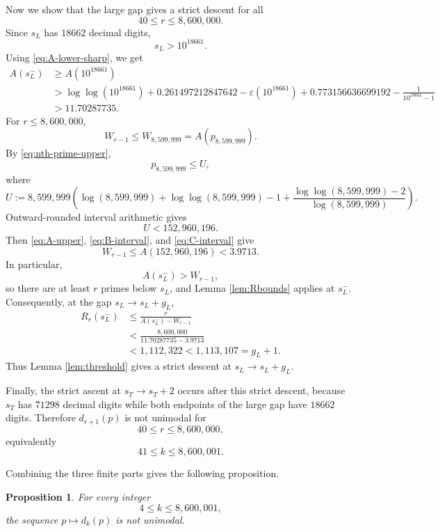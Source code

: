 \documentclass[11pt]{article}
\numberwithin{equation}{section}
\theoremstyle{plain}
\newtheorem{proposition}[theorem]{Proposition}
\theoremstyle{definition}
\theoremstyle{remark}
\newcommand{\eps}{\varepsilon}
\begin{document}
Now we show that the large gap gives a strict descent for all
\[
        40\le r\le8{,}600{,}000.
\]
Since \(s_L\) has \(18662\) decimal digits,
\[
        s_L>10^{18661}.
\]
Using \eqref{eq:A-lower-sharp}, we get
\[
\begin{aligned}
        A(s_L^-)
        &\ge
        A(10^{18661}) \\
        &>
        \log\log(10^{18661})
        +0.261497212847642
        -\eps(10^{18661})
        +0.773156636699192
        -\frac1{10^{18661}-1}\\
        &>11.70287735.
\end{aligned}
\]
For \(r\le8{,}600{,}000\),
\[
        W_{r-1}\le W_{8{,}599{,}999}=A(p_{8{,}599{,}999}).
\]
By \eqref{eq:nth-prime-upper},
\[
        p_{8{,}599{,}999}\le U,
\]
where
\[
        U:=8{,}599{,}999\left(
        \log(8{,}599{,}999)+\log\log(8{,}599{,}999)-1+
        \frac{\log\log(8{,}599{,}999)-2}{\log(8{,}599{,}999)}
        \right).
\]
Outward-rounded interval arithmetic gives
\[
        U<152{,}960{,}196.
\]
Then \eqref{eq:A-upper}, \eqref{eq:B-interval}, and \eqref{eq:C-interval} give
\[
        W_{r-1}\le A(152{,}960{,}196)<3.9713.
\]
In particular,
\[
        A(s_L^-)>W_{r-1},
\]
so there are at least \(r\) primes below \(s_L\), and Lemma \ref{lem:Rbounds} applies at \(s_L^-\).  Consequently, at the gap \(s_L\to s_L+g_L\),
\[
\begin{aligned}
        R_r(s_L^-)
        &\le
        \frac{r}{A(s_L^-)-W_{r-1}}\\
        &<
        \frac{8{,}600{,}000}{11.70287735-3.9713}\\
        &<1{,}112{,}322
        <1{,}113{,}107
        =g_L+1.
\end{aligned}
\]
Thus Lemma \ref{lem:threshold} gives a strict descent at \(s_L\to s_L+g_L\).

Finally, the strict ascent at \(s_T\to s_T+2\) occurs after this strict descent, because \(s_T\) has \(71298\) decimal digits while both endpoints of the large gap have \(18662\) digits.  Therefore \(d_{r+1}(p)\) is not unimodal for
\[
        40\le r\le8{,}600{,}000,
\]
equivalently
\[
        41\le k\le8{,}600{,}001.
\]

Combining the three finite parts gives the following proposition.

\begin{proposition}\label{prop:finite}
For every integer
\[
        4\le k\le8{,}600{,}001,
\]
the sequence \(p\mapsto d_k(p)\) is not unimodal.
\end{proposition}
\end{document}
